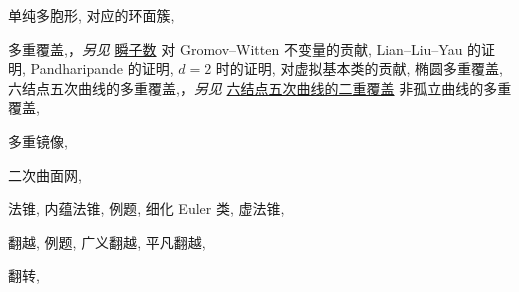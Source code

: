 \begin{theindex}
\subitem \leavevmode\hypertarget{idx:1081}{单纯多胞形},\enspace{}
\subitem \leavevmode\hypertarget{idx:1082}{对应的环面簇},\enspace{}
\indexspace
\item \leavevmode\hypertarget{idx:0915}{多重覆盖},\enspace{}，\textit{另见} \hyperlink{idx:0628}{瞬子数}
\subitem \leavevmode\hypertarget{idx:0916}{对 Gromov--Witten 不变量的贡献},\enspace{}
\subsubitem \leavevmode\hypertarget{idx:0917}{Lian--Liu--Yau 的证明},\enspace{}
\subsubitem \leavevmode\hypertarget{idx:0918}{Pandharipande 的证明},\enspace{}
\subsubitem \leavevmode\hypertarget{idx:0919}{$d=2$ 时的证明},\enspace{}
\subitem \leavevmode\hypertarget{idx:0920}{对虚拟基本类的贡献},\enspace{}
\subitem \leavevmode\hypertarget{idx:0921}{椭圆多重覆盖},\enspace{}
\subitem \leavevmode\hypertarget{idx:0922}{六结点五次曲线的多重覆盖},\enspace{}，\textit{另见} \hyperlink{idx:0218}{六结点五次曲线的二重覆盖}
\subitem \leavevmode\hypertarget{idx:0923}{非孤立曲线的多重覆盖},\enspace{}
\indexspace
\item \leavevmode\hypertarget{idx:0924}{多重镜像},\enspace{}
\indexspace
\item \leavevmode\hypertarget{idx:0937}{二次曲面网},\enspace{}
\indexspace
\item \leavevmode\hypertarget{idx:0947}{法锥},\enspace{}
\subitem \leavevmode\hypertarget{idx:0948}{内蕴法锥},\enspace{}
\subsubitem \leavevmode\hypertarget{idx:0949}{例题},\enspace{}
\subitem \leavevmode\hypertarget{idx:0950}{细化 Euler 类},\enspace{}
\subitem \leavevmode\hypertarget{idx:0951}{虚法锥},\enspace{}
\indexspace
\item \leavevmode\hypertarget{idx:0332}{翻越},\enspace{}
\subitem \leavevmode\hypertarget{idx:0333}{例题},\enspace{}
\subitem \leavevmode\hypertarget{idx:0334}{广义翻越},\enspace{}
\subitem \leavevmode\hypertarget{idx:0335}{平凡翻越},\enspace{}
\indexspace
\item \leavevmode\hypertarget{idx:0328}{翻转},\enspace{}

\end{theindex}
